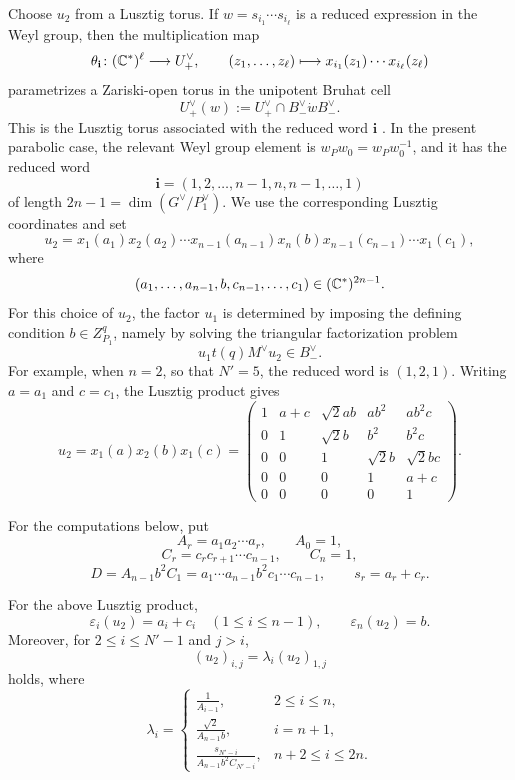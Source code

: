 Choose \(u_2\) from a Lusztig torus. If \(w=s_{i_1}\cdots s_{i_\ell}\) is a reduced expression in the Weyl group, then the multiplication map
\[
\theta_{\mathbf i}\colon(\mathbb{C}^*)^\ell\longrightarrow U_+^\vee,
\qquad
(z_1,\ldots,z_\ell)\longmapsto x_{i_1}(z_1)\cdots x_{i_\ell}(z_\ell)
\]
parametrizes a Zariski-open torus in the unipotent Bruhat cell
\[
U_+^\vee(w):=U_+^\vee\cap B_-^\vee\dot wB_-^\vee .
\]
This is the Lusztig torus associated with the reduced word \(\mathbf i\) \cite{Lusztig,MR}. In the present parabolic case, the relevant Weyl group element is \(w_Pw_0=w_Pw_0^{-1}\), and it has the reduced word
\[
\mathbf i=(1,2,\ldots,n-1,n,n-1,\ldots,1)
\]
of length \(2n-1=\dim(G^\vee/P_1^\vee)\). We use the corresponding Lusztig coordinates and set
\[
u_2=
 x_1(a_1)x_2(a_2)\cdots x_{n-1}(a_{n-1})x_n(b)
 x_{n-1}(c_{n-1})\cdots x_1(c_1),
\]
where
\[
(a_1,\ldots,a_{n-1},b,c_{n-1},\ldots,c_1)\in(\mathbb{C}^*)^{2n-1}.
\]
For this choice of \(u_2\), the factor \(u_1\) is determined by imposing the defining condition \(b\in Z_{P_1}^q\), namely by solving the triangular factorization problem
\[
u_1t(q)M^\vee u_2\in B_-^\vee.
\]
For example, when \(n=2\), so that \(N'=5\), the reduced word is \((1,2,1)\). Writing \(a=a_1\) and \(c=c_1\), the Lusztig product gives
\[
u_2=x_1(a)x_2(b)x_1(c)
=
\begin{pmatrix}
1&a+c&\sqrt2ab&ab^2&ab^2c\\
0&1&\sqrt2b&b^2&b^2c\\
0&0&1&\sqrt2b&\sqrt2bc\\
0&0&0&1&a+c\\
0&0&0&0&1
\end{pmatrix}.
\]

For the computations below, put
\[
A_r=a_1a_2\cdots a_r,
\qquad
A_0=1,
\]
\[
C_r=c_rc_{r+1}\cdots c_{n-1},
\qquad
C_n=1,
\]
\[
D=A_{n-1}b^2C_1
=a_1\cdots a_{n-1}b^2c_1\cdots c_{n-1},
\qquad
s_r=a_r+c_r.
\]

\begin{lemma}\label{lem:u2-contribution}
For the above Lusztig product,
\[
\varepsilon_i(u_2)=a_i+c_i\quad(1\le i\le n-1),
\qquad
\varepsilon_n(u_2)=b.
\]
Moreover, for \(2\le i\le N'-1\) and \(j>i\),
\begin{equation}\label{eq:u2-entry-relation}
(u_2)_{i,j}=\lambda_i (u_2)_{1,j}
\end{equation}
holds, where
\[
\lambda_i=
\begin{cases}
\displaystyle \frac{1}{A_{i-1}}, & 2\le i\le n,\\[1.1em]
\displaystyle \frac{\sqrt2}{A_{n-1}b}, & i=n+1,\\[1.1em]
\displaystyle \frac{s_{N'-i}}{A_{n-1}b^2C_{N'-i}}, & n+2\le i\le 2n.
\end{cases}
\]
\end{lemma}

